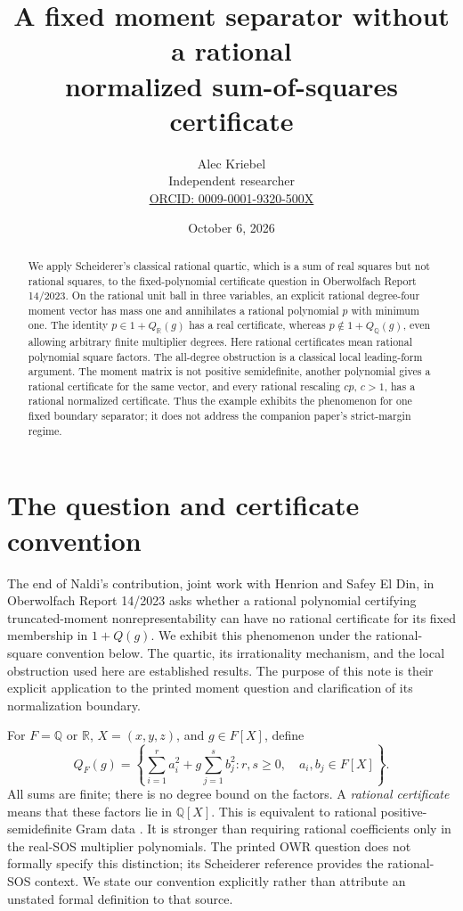 \documentclass[11pt]{article}
\title{A fixed moment separator without a rational\\ normalized sum-of-squares certificate}
\author{Alec Kriebel\\
  \small Independent researcher\\
  \small \href{https://orcid.org/0009-0001-9320-500X}{ORCID: 0009-0001-9320-500X}}
\date{October 6, 2026}
\newcommand{\Q}{\mathbb Q}
\newcommand{\R}{\mathbb R}
\begin{document}
\maketitle
\begin{abstract}
We apply Scheiderer's classical rational quartic, which is a sum of real
squares but not rational squares, to the fixed-polynomial certificate question
in Oberwolfach Report 14/2023. On the rational unit ball in three variables,
an explicit rational degree-four moment vector has mass one and annihilates
a rational polynomial \(p\) with minimum one. The identity
\(p\in1+Q_{\R}(g)\) has a real certificate, whereas
\(p\notin1+Q_{\Q}(g)\), even allowing arbitrary finite multiplier degrees.
Here rational certificates mean rational polynomial square factors.
The all-degree obstruction is a classical local leading-form argument.
The moment matrix is not positive semidefinite, another polynomial gives a
rational certificate for the same vector, and every rational rescaling
\(cp\), \(c>1\), has a rational normalized certificate.
Thus the example exhibits the phenomenon for one fixed boundary separator;
it does not address the companion paper's strict-margin regime.
\end{abstract}

\section{The question and certificate convention}
The end of Naldi's contribution, joint work with Henrion and Safey El Din,
in Oberwolfach Report 14/2023 \cite[pp.~802--804]{OWR} asks whether a
rational polynomial certifying truncated-moment nonrepresentability can have
no rational certificate for its fixed membership in \(1+Q(g)\).
We exhibit this phenomenon under the rational-square convention below.
The quartic, its irrationality mechanism, and the local obstruction used
here are established results. The purpose of this note is their explicit
application to the printed moment question and clarification of its
normalization boundary.

For \(F=\Q\) or \(\R\), \(X=(x,y,z)\), and \(g\in F[X]\), define
\[
 Q_F(g)=
 \left\{\sum_{i=1}^r a_i^2+g\sum_{j=1}^s b_j^2:
 r,s\geq0,\quad a_i,b_j\in F[X]\right\}.
\]
All sums are finite; there is no degree bound on the factors.
A \emph{rational certificate} means that these factors lie in \(\Q[X]\).
This is equivalent to rational positive-semidefinite Gram data
\cite[Lemma~1.6]{Gram}. It is stronger than requiring rational coefficients
only in the real-SOS multiplier polynomials. The printed OWR question does
not formally specify this distinction; its Scheiderer reference provides
the rational-SOS context. We state our convention explicitly rather than
attribute an unstated formal definition to that source.
\end{document}
